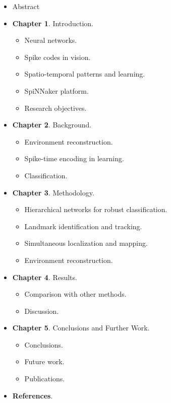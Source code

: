   \begin{itemize}
      \item Abstract
      \item \textbf{Chapter 1}. Introduction.
      \begin{itemize}
        \item Neural networks.
        \item Spike codes in vision.
        \item Spatio-temporal patterns and learning.
        \item SpiNNaker platform.
        \item Research objectives.
      \end{itemize}
      \item \textbf{Chapter 2}. Background.
      \begin{itemize}
        \item Environment reconstruction.
        \item Spike-time encoding in learning.
        \item Classification.
      \end{itemize}
      \item \textbf{Chapter 3}. Methodology.
      \begin{itemize}
      \item Hierarchical networks for robust classification.
      \item Landmark identification and tracking.
      \item Simultaneous localization and mapping.
      \item Environment reconstruction.
      \end{itemize}
      \item \textbf{Chapter 4}. Results.
      \begin{itemize}
        \item Comparison with other methods.
        \item Discussion.
      \end{itemize}
      \vspace*{1cm}
      \item \textbf{Chapter 5}. Conclusions and Further Work.
      \begin{itemize}
        \item Conclusions.
        \item Future work.
        \item Publications.
      \end{itemize}
      \item \textbf{References}.
      
  \end{itemize}
